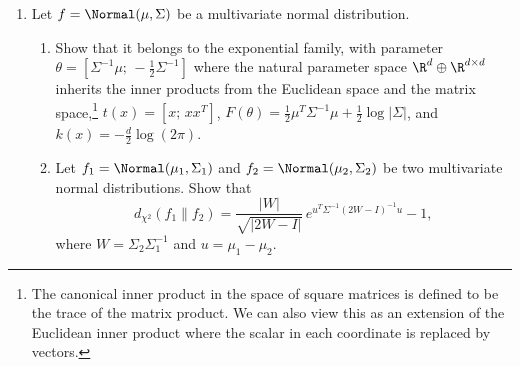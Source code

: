 \begin{enumerate}
\item[3.7] Let $f = \Normal(\mu, \Sigma)$ be a multivariate normal
distribution.
\begin{enumerate}
  \item[(a)] Show that it belongs to the exponential family, with parameter
             $\theta = [\Sigma^{-1}\mu;\, -\tfrac{1}{2}\Sigma^{-1}]$ where
             the natural parameter space $\R^d \oplus \R^{d \times d}$ inherits
             the inner products from the Euclidean space and the matrix
             space,\footnote{The canonical inner product in the space of square
             matrices is defined to be the trace of the matrix product. We can
             also view this as an extension of the Euclidean inner product where
             the scalar in each coordinate is replaced by vectors.}
             $t(x) = [x;\, xx^T]$,
             $F(\theta) = \tfrac{1}{2}\mu^T\Sigma^{-1}\mu
               + \tfrac{1}{2}\log|\Sigma|$, and
             $k(x) = -\tfrac{d}{2}\log(2\pi)$.

  \item[(b)] Let $f_1 = \Normal(\mu_1, \Sigma_1)$ and
             $f_2 = \Normal(\mu_2, \Sigma_2)$ be two multivariate normal
             distributions. Show that
             \[
               d_{\chi^2}(f_1\|f_2)
               = \frac{|W|}{\sqrt{|2W - I|}}\,
                 e^{u^T \Sigma^{-1}(2W-I)^{-1} u}
                 - 1,
             \]
             where $W = \Sigma_2 \Sigma_1^{-1}$ and $u = \mu_1 - \mu_2$.
\end{enumerate}

\end{enumerate}
